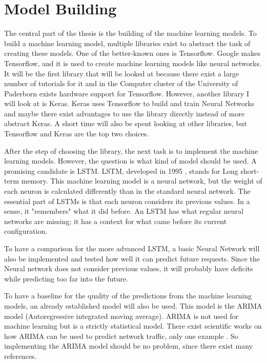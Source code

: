 \documentclass[12pt,a4paper]{scrartcl}
\begin{document}
	\section{Model Building}
	The central part of the thesis is the building of the machine learning models.
	To build a machine learning model, multiple libraries exist to abstract the task of creating these models.
	One of the better-known ones is Tensorflow. Google makes Tensorflow, and it is used to create machine learning models like neural networks.
	It will be the first library that will be looked at because there exist a large number of tutorials for it and in the Computer cluster of the University of Paderborn exists hardware support for Tensorflow.
	However, another library I will look at is Keras.
	Keras uses Tensorflow to build and train Neural Networks and maybe there exist advantages to use the library directly instead of more abstract Keras.
	A short time will also be spent looking at other libraries, but Tensorflow and Keras are the top two choices.
	
	After the step of choosing the library, the next task is to implement the machine learning models.
	However, the question is what kind of model should be used.
	A promising candidate is LSTM.
	LSTM, developed in 1995 \cite{lstmOrig}, stands for Long short-term memory.
	This machine learning model is a neural network, but the weight of each neuron is calculated differently than in the standard neural network.
	The essential part of LSTMs is that each neuron considers its previous values.
	In a sense, it "remembers" what it did before.
	An LSTM has what regular neural networks are missing; it has a context for what came before its current configuration. 
	
	To have a comparison for the more advanced LSTM, a basic Neural Network will also be implemented and tested how well it can predict future requests.
	Since the Neural network does not consider previous values, it will probably have deficits while predicting too far into the future.
	
	To have a baseline for the quality of the predictions from the machine learning models, an already established model will also be used.
	This model is the ARIMA model (Autoregressive integrated moving average).
	ARIMA is not used for machine learning but is a strictly statistical model.
	There exist scientific works on how ARIMA can be used to predict network traffic, only one example \cite{ArimaTraffic}. So implementing the ARIMA model should be no problem, since there exist many references.
	
\end{document}

